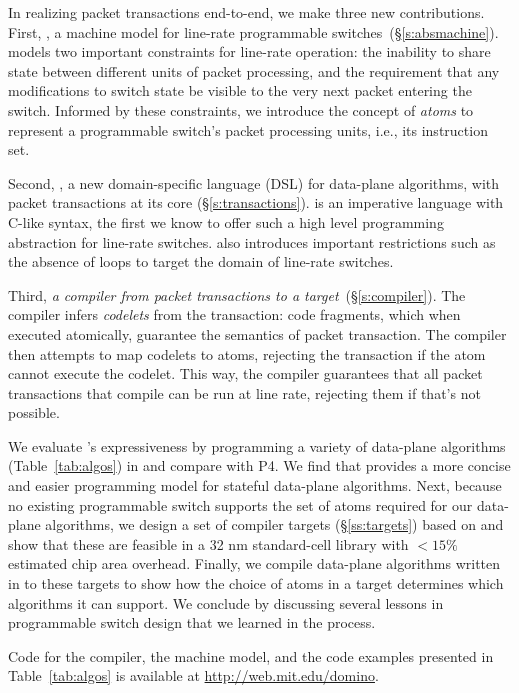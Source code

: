 In realizing packet transactions end-to-end, we make three new contributions.
First, {\em \absmachine}, a machine model for line-rate programmable
switches~\cite{rmt, xpliant, flexpipe}(\S\ref{s:absmachine}).  \absmachine
models two important constraints for line-rate operation: the inability to
share state between different units of packet processing, and the requirement
that any modifications to switch state be visible to the very next packet
entering the switch. Informed by these constraints, we introduce the concept of
{\em atoms} to represent a programmable switch's packet processing units, i.e.,
its instruction set.

Second, {\em \pktlanguage{}}, a new domain-specific language (DSL) for
data-plane algorithms, with packet transactions at its core
(\S\ref{s:transactions}).  \pktlanguage is an imperative language with C-like
syntax, the first we know to offer such a high level programming abstraction
for line-rate switches. \pktlanguage also introduces important restrictions
such as the absence of loops to target the domain of line-rate switches.

Third, {\em a compiler from \pktlanguage packet transactions to a \absmachine
target}~(\S\ref{s:compiler}). The \pktlanguage compiler infers {\em codelets}
from the transaction: code fragments, which when executed atomically, guarantee
the semantics of packet transaction. The compiler then attempts to map codelets
to atoms, rejecting the transaction if the atom cannot execute the codelet.
This way, the compiler guarantees that all packet transactions that compile can
be run at line rate, rejecting them if that's not possible.

We evaluate \pktlanguage's expressiveness by programming a variety of
data-plane algorithms (Table~\ref{tab:algos}) in \pktlanguage and compare with
P4. We find that \pktlanguage provides a more concise and easier programming
model for stateful data-plane algorithms.  Next, because no existing
programmable switch supports the set of atoms required for our data-plane
algorithms, we design a set of compiler targets (\S\ref{ss:targets}) based on
\absmachine and show that these are feasible in a 32 nm standard-cell library
with $< 15\%$ estimated chip area overhead. Finally, we compile data-plane
algorithms written in \pktlanguage to these targets to show how the choice of
atoms in a target determines which algorithms it can support. We conclude by
discussing several lessons in programmable switch design that we learned in the
process.

Code for the \pktlanguage compiler, the \absmachine machine model, and the code
examples presented in Table~\ref{tab:algos} is available at
\url{http://web.mit.edu/domino}.
